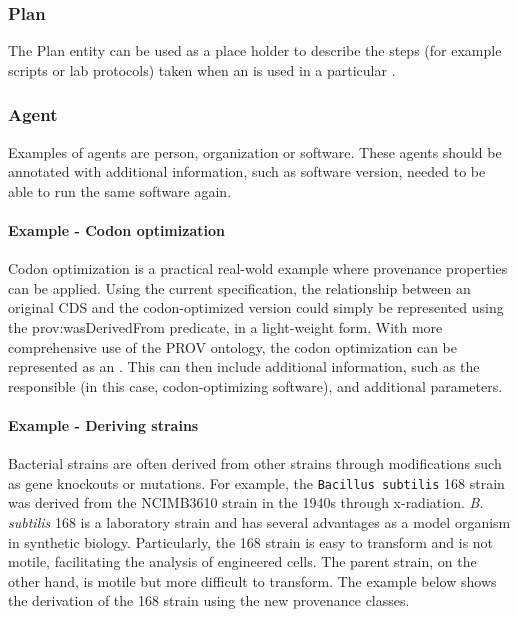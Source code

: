 \subsubsection{Plan}
\label{sec:Plan}

 The Plan entity can be used as a place holder to describe the steps (for example scripts or lab protocols) taken when an  is used in a particular . 

\subsubsection{Agent}
\label{sec:Agent}

 Examples of agents are person, organization or software. These agents should be annotated with additional information, such as software version, needed to be able to run the same software again.

\paragraph{Example - Codon optimization}

 Codon optimization is a practical real-wold example where provenance properties can be applied. Using the current specification, the relationship between an original CDS and the codon-optimized version could simply be represented using the prov:wasDerivedFrom predicate, in a light-weight form. With more comprehensive use of the PROV ontology, the codon optimization can be represented as an . This  can then include additional information, such as the  responsible (in this case, codon-optimizing software), and additional parameters.

\paragraph{Example - Deriving strains}

Bacterial strains are often derived from other strains through modifications such as gene knockouts or mutations. For example, the \texttt{Bacillus subtilis} 168 strain was derived from the NCIMB3610 strain in the 1940s through x-radiation. \textit{B. subtilis} 168 is a laboratory strain and has several advantages as a model organism in synthetic biology. Particularly, the 168 strain is easy to transform and is not motile, facilitating the analysis of engineered cells. The parent strain, on the other hand, is motile but more difficult to transform. The example below shows the derivation of the 168 strain using the new provenance classes.

